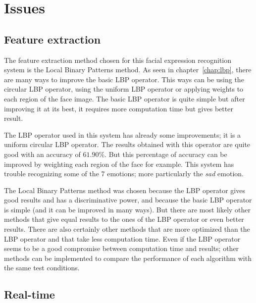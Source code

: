 \chapter{Issues}
\label{chap:eval_issues}

\section{Feature extraction}

\vspace{\baselineskip}
\noindent The feature extraction method chosen for this facial expression recognition system is the Local Binary Patterns method. As seen in chapter~\ref{chap:lbp}, there are many ways to improve the basic LBP operator. This ways can be using the circular LBP operator, using the uniform LBP operator or applying weights to each region of the face image. The basic LBP operator is quite simple but after improving it at its best, it requires more computation time but gives better result.
\newline

\noindent The LBP operator used in this system has already some improvements; it is a uniform circular LBP operator. The results obtained with this operator are quite good with an accuracy of $ 61.90\% $. But this percentage of accuracy can be improved by weighting each region of the face for example. This system has trouble recognizing some of the 7 emotions; more particularly the \textit{sad} emotion.
\newline

\noindent The Local Binary Patterns method was chosen because the LBP operator gives good results and has a discriminative power, and because the basic LBP operator is simple (and it can be improved in many ways). But there are most likely other methods that give equal results to the ones of the LBP operator or even better results. There are also certainly other methods that are more optimized than the LBP operator and that take less computation time. Even if the LBP operator seems to be a good compromise between computation time and results; other methods can be implemented to compare the performance of each algorithm with the same test conditions.
\newline

\section{Real-time}

